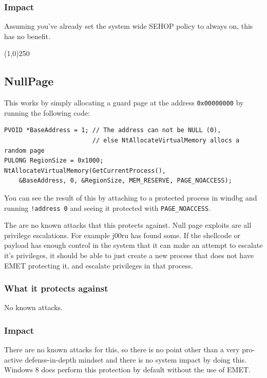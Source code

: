 \documentclass[]{article}
\newcommand{\sectionbreakline}[0]{\begin{center}\line(1,0){250}\end{center}}
\begin{document}
\subsubsection{Impact}
Assuming you've already set the system wide SEHOP policy to always on, this has no benefit.

\sectionbreakline{}








\subsection{NullPage}\label{nullpage}

This works by simply allocating a guard page at the address \texttt{0x00000000} by running the following code:

\begin{verbatim}
PVOID *BaseAddress = 1; // The address can not be NULL (0),
                        // else NtAllocateVirtualMemory allocs a random page
PULONG RegionSize = 0x1000;
NtAllocateVirtualMemory(GetCurrentProcess(),
    &BaseAddress, 0, &RegionSize, MEM_RESERVE, PAGE_NOACCESS);
\end{verbatim}

You can see the result of this by attaching to a protected process in windbg and running \texttt{!address 0} and seeing it protected with \texttt{PAGE\_NOACCESS}.

The are no known attacks that this protects against.  Null page exploits are all privilege escalations. For example j00ru has found some\cite{null_priv1, null_priv2}.  If the shellcode or payload has enough control in the system that it can make an attempt to escalate it's privileges, it should be able to just create a new process that does not have EMET protecting it, and escalate privileges in that process.


\subsubsection{What it protects against}
No known attacks.

\subsubsection{Impact}
There are no known attacks for this, so there is no point other than a very pro-active defense-in-depth mindset and there is no system impact by doing this.  Windows 8 does perform this protection by default without the use of EMET.
\end{document}
